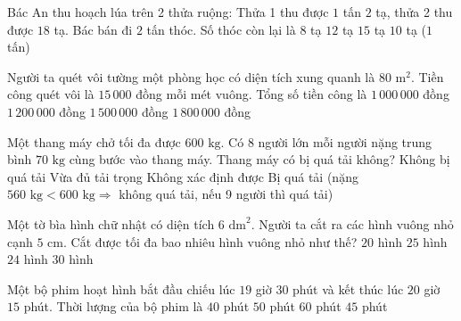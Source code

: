 \begin{ex} %
Bác An thu hoạch lúa trên 2 thửa ruộng: Thửa 1 thu được $1$ tấn $2$ tạ, thửa 2 thu được $18$ tạ. Bác bán đi $2$ tấn thóc. Số thóc còn lại là
\choice
{$8$ tạ}
{$12$ tạ}
{$15$ tạ}
{\True $10$ tạ ($1$ tấn)}
\end{ex}

\begin{ex} %
Người ta quét vôi tường một phòng học có diện tích xung quanh là $80\text{ m}^2$. Tiền công quét vôi là $15\,000$ đồng mỗi mét vuông. Tổng số tiền công là
\choice
{$1\,000\,000$ đồng}
{\True $1\,200\,000$ đồng}
{$1\,500\,000$ đồng}
{$1\,800\,000$ đồng}
\end{ex}

\begin{ex} %
Một thang máy chở tối đa được $600\text{ kg}$. Có $8$ người lớn mỗi người nặng trung bình $70\text{ kg}$ cùng bước vào thang máy. Thang máy có bị quá tải không?
\choice
{Không bị quá tải}
{Vừa đủ tải trọng}
{Không xác định được}
{\True Bị quá tải (nặng $560\text{ kg} < 600\text{ kg} \Rightarrow$ không quá tải, nếu 9 người thì quá tải)}
\end{ex}

\begin{ex} %
Một tờ bìa hình chữ nhật có diện tích $6\text{ dm}^2$. Người ta cắt ra các hình vuông nhỏ cạnh $5\text{ cm}$. Cắt được tối đa bao nhiêu hình vuông nhỏ như thế?
\choice
{$20$ hình}
{$25$ hình}
{\True $24$ hình}
{$30$ hình}
\end{ex}

\begin{ex} %
Một bộ phim hoạt hình bắt đầu chiếu lúc $19$ giờ $30$ phút và kết thúc lúc $20$ giờ $15$ phút. Thời lượng của bộ phim là
\choice
{$40$ phút}
{$50$ phút}
{$60$ phút}
{\True $45$ phút}
\end{ex}

